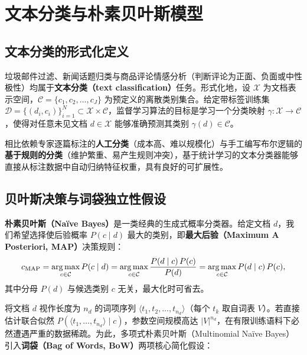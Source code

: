 \section{文本分类与朴素贝叶斯模型}\label{sec:naive-bayes}

\subsection{文本分类的形式化定义}

垃圾邮件过滤、新闻话题归类与商品评论情感分析（判断评论为正面、负面或中性极性）均属于\textbf{文本分类（text classification）}任务。形式化地，设 $\mathcal{X}$ 为文档表示空间，$\mathcal{C}=\{c_1,c_2,\dots,c_J\}$ 为预定义的离散类别集合。给定带标签训练集 $\mathcal{D}=\{(d_i, c_i)\}_{i=1}^{N}\subset \mathcal{X}\times\mathcal{C}$，监督学习算法的目标是学习一个分类映射 $\gamma:\mathcal{X}\to\mathcal{C}$，使得对任意未见文档 $d\in\mathcal{X}$ 能够准确预测其类别 $\gamma(d)\in\mathcal{C}$。

相比依赖专家逐篇标注的\textbf{人工分类}（成本高、难以规模化）与手工编写布尔逻辑的\textbf{基于规则的分类}（维护繁重、易产生规则冲突），基于统计学习的文本分类器能够直接从标注数据中自动归纳特征权重，具有良好的可扩展性。

\subsection{贝叶斯决策与词袋独立性假设}

\textbf{朴素贝叶斯（Na\"{i}ve Bayes）}是一类经典的生成式概率分类器。给定文档 $d$，我们希望选择使后验概率 $P(c\mid d)$ 最大的类别，即\textbf{最大后验（Maximum A Posteriori, MAP）}决策规则：
\begin{equation}\label{eq:nb-map}
c_{\mathrm{MAP}} = \operatorname*{arg\,max}_{c\in\mathcal{C}} P(c\mid d)
= \operatorname*{arg\,max}_{c\in\mathcal{C}} \frac{P(d\mid c)\,P(c)}{P(d)}
= \operatorname*{arg\,max}_{c\in\mathcal{C}} P(d\mid c)\,P(c),
\end{equation}
其中分母 $P(d)$ 与候选类别 $c$ 无关，最大化时可省去。

将文档 $d$ 视作长度为 $n_d$ 的词项序列 $\langle t_1, t_2, \dots, t_{n_d}\rangle$（每个 $t_k$ 取自词表 $V$）。若直接估计联合似然 $P(\langle t_1,\dots,t_{n_d}\rangle \mid c)$，参数空间规模高达 $|V|^{n_d}$，在有限训练语料下必然遭遇严重的数据稀疏。为此，多项式朴素贝叶斯（Multinomial Na\"{i}ve Bayes）引入\textbf{词袋（Bag of Words, BoW）}两项核心简化假设：

